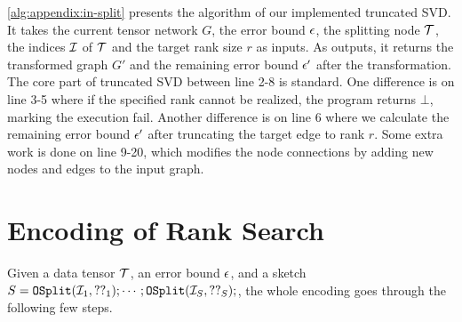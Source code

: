 \cref{alg:appendix:in-split} presents the algorithm of our implemented truncated SVD.
%
It takes the current tensor network $G$, the error bound $\epsilon$, the splitting node $\mathcal{T}$, the indices $\mathcal{I}$ of $\mathcal{T}$ and the target rank size $r$ as inputs.
%
As outputs, it returns the transformed graph $G'$ and the remaining error bound $\epsilon'$ after the transformation.
%
The core part of truncated SVD between line 2-8 is standard.
%
One difference is on line 3-5 where if the specified rank cannot be realized, the program returns $\bot$, marking the execution fail.
%
Another difference is on line 6 where we calculate the remaining error bound $\epsilon'$ after truncating the target edge to rank $r$.
%
Some extra work is done on line 9-20, which modifies the node connections by adding new nodes and edges to the input graph.

\section{Encoding of Rank Search}\label{sec:appendix:encoding}
%
Given a data tensor $\mathcal{T}$, an error bound $\epsilon$, and a sketch $S = \mathtt{OSplit}(\mathcal{I}_1, ??_1); \cdots; \mathtt{OSplit}(\mathcal{I}_S, ??_S);$, the whole encoding goes through the following few steps.

